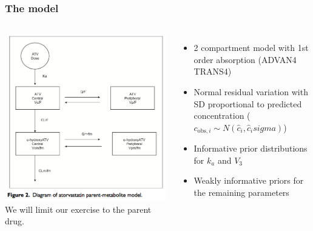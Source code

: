 \documentclass{beamer}
\begin{document}
\begin{frame}
  \frametitle{The model}

\begin{columns}
\includegraphics[width=\textwidth]{graphics/KnebelModel.png}
We will limit our exercise to the parent drug.
\begin{itemize}
\item 2 compartment model with 1st order absorption (ADVAN4 TRANS4)
\item Normal residual variation with SD proportional to predicted
  concentration ($c_{\text{obs},i} \sim N\left(\widehat{c}_i,
    \widehat{c}_i sigma\right)$)
\item Informative prior distributions for $k_a$ and $V_3$
\item Weakly informative priors for the remaining parameters
\end{itemize}
\end{columns}

\end{frame}
\end{document}
